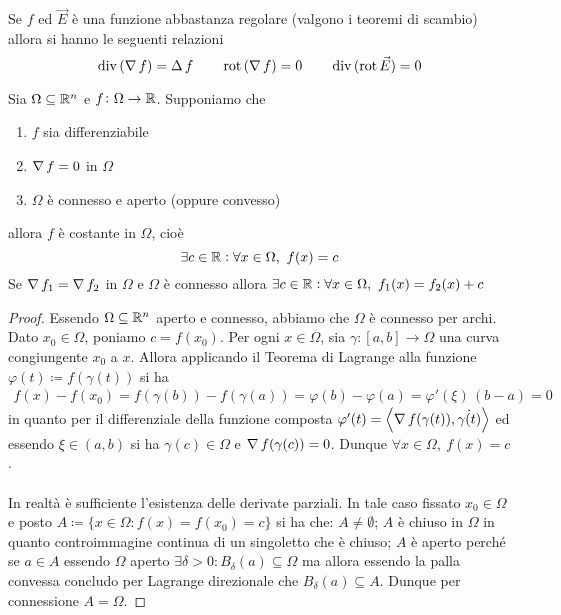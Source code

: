 \begin{prop}
	Se $ f $ ed $ \vec{E} $ è una funzione abbastanza regolare (valgono i teoremi di scambio) allora si hanno le seguenti relazioni
	\begin{equation}
		\operatorname{div}{(\operatorname{\nabla}{f})} = \operatorname{\Delta}{f} \qquad \operatorname{rot}{(\operatorname{\nabla}{f})} = 0 \qquad \operatorname{div}{(\operatorname{rot}{\vec{E}})} = 0
	\end{equation}
\end{prop}	

\begin{prop}
	Sia $ \Omega \subseteq \mathbb{R}^n $ e $ f \colon \Omega \to \mathbb{R} $. Supponiamo che
	\begin{enumerate}[label = (\roman*)]
		\item $ f $ sia differenziabile 
		\item $ \operatorname{\nabla}{f} = 0 $ in $ \Omega $
		\item $ \Omega $ è connesso e aperto (oppure convesso)
	\end{enumerate} 
	allora $ f $ è costante in $ \Omega $, cioè 
	\begin{equation}
		\exists c \in \mathbb{R} : \forall x \in \Omega, \ f(x) = c
	\end{equation}
	Se $ \operatorname{\nabla}{f_1} = \operatorname{\nabla}{f_2} $ in $ \Omega $ e $ \Omega $ è connesso allora $ \exists c \in \mathbb{R} : \forall x \in \Omega, \ f_1(x) = f_2(x) + c $
\end{prop}
%
\begin{proof}
	Essendo $ \Omega \subseteq \mathbb{R}^n $ aperto e connesso, abbiamo che $ \Omega $ è connesso per archi. Dato $ x_0 \in \Omega $, poniamo $ c = f(x_0) $. Per ogni $ x \in \Omega $, sia $ \gamma \colon [a, b] \to \Omega $ una curva congiungente $ x_0 $ a $ x $. Allora applicando il Teorema di Lagrange alla funzione $ \varphi(t) \coloneqq f(\gamma(t)) $ si ha
	\begin{align*}
		f(x) - f(x_0) = f(\gamma(b)) - f(\gamma(a)) = \varphi(b) - \varphi(a) = \varphi'(\xi) \, (b - a) = 0
	\end{align*}
	in quanto per il differenziale della funzione composta $ \varphi'(t) = \left\langle \operatorname{\nabla}{f}(\gamma(t)), \dot{\gamma{(t)}} \right\rangle $ ed essendo $ \xi \in (a, b) $ si ha $ \gamma(c) \in \Omega $ e $ \operatorname{\nabla}{f}(\gamma(c)) = 0 $. Dunque $ \forall x \in \Omega, \ f(x) = c $. \\
	\ \\
	In realtà è sufficiente l'esistenza delle derivate parziali. In tale caso fissato $ x_0 \in \Omega $ e posto $ A \coloneqq \{x \in \Omega : f(x) = f(x_0) = c\} $ si ha che: $ A \neq \emptyset $; $ A $ è chiuso in $ \Omega $ in quanto controimmagine continua di un singoletto che è chiuso; $ A $ è aperto perché se $ a \in A $ essendo $ \Omega $ aperto $ \exists \delta > 0 : B_\delta(a) \subseteq \Omega $ ma allora essendo la palla convessa concludo per Lagrange direzionale che $ B_\delta(a) \subseteq A $. Dunque per connessione $ A = \Omega $. 
\end{proof}

